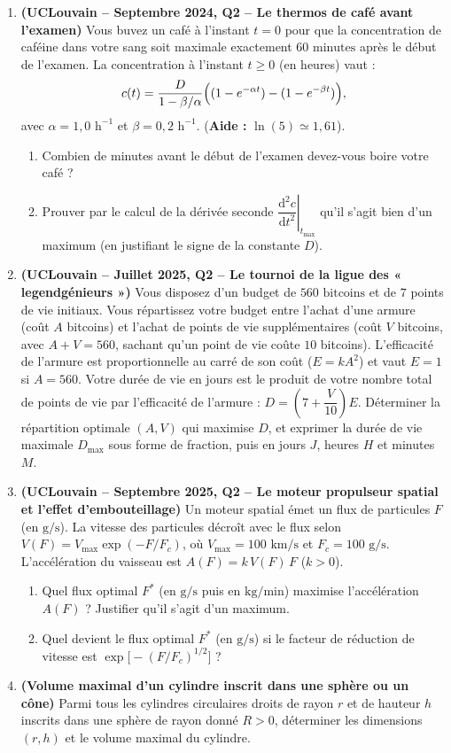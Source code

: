 \begin{enumerate}[label=\textbf{Exercice 5.\arabic* --}]
    \item \textbf{(UCLouvain -- Septembre 2024, Q2 -- Le thermos de café avant l'examen)} Vous buvez un café à l'instant $t = 0$ pour que la concentration de caféine dans votre sang soit maximale exactement $60\text{ minutes}$ après le début de l'examen. La concentration à l'instant $t \ge 0$ (en heures) vaut :
    \[
        c(t) = \frac{D}{1 - \beta/\alpha}\Bigl((1 - e^{-\alpha t}) - (1 - e^{-\beta t})\Bigr),
    \]
    avec $\alpha = 1,0\text{ h}^{-1}$ et $\beta = 0,2\text{ h}^{-1}$. (\textbf{Aide :} $\ln(5) \simeq 1,61$).
    \begin{enumerate}
        \item Combien de minutes avant le début de l'examen devez-vous boire votre café ?
        \item Prouver par le calcul de la dérivée seconde $\left.\dfrac{\mathrm{d}^2 c}{\mathrm{d}t^2}\right|_{t_{\max}}$ qu'il s'agit bien d'un maximum (en justifiant le signe de la constante $D$).
    \end{enumerate}

    \item \textbf{(UCLouvain -- Juillet 2025, Q2 -- Le tournoi de la ligue des « legendgénieurs »)} Vous disposez d'un budget de $560\text{ bitcoins}$ et de $7$ points de vie initiaux. Vous répartissez votre budget entre l'achat d'une armure (coût $A$ bitcoins) et l'achat de points de vie supplémentaires (coût $V$ bitcoins, avec $A + V = 560$, sachant qu'un point de vie coûte $10$ bitcoins). L'efficacité de l'armure est proportionnelle au carré de son coût ($E = kA^2$) et vaut $E = 1$ si $A = 560$. Votre durée de vie en jours est le produit de votre nombre total de points de vie par l'efficacité de l'armure : $D = \left(7 + \dfrac{V}{10}\right)E$.
    Déterminer la répartition optimale $(A, V)$ qui maximise $D$, et exprimer la durée de vie maximale $D_{\max}$ sous forme de fraction, puis en jours $J$, heures $H$ et minutes $M$.

    \item \textbf{(UCLouvain -- Septembre 2025, Q2 -- Le moteur propulseur spatial et l'effet d'embouteillage)} Un moteur spatial émet un flux de particules $F$ (en $\text{g/s}$). La vitesse des particules décroît avec le flux selon $V(F) = V_{\max}\exp(-F/F_c)$, où $V_{\max} = 100\text{ km/s}$ et $F_c = 100\text{ g/s}$. L'accélération du vaisseau est $A(F) = k\,V(F)\,F$ ($k > 0$).
    \begin{enumerate}
        \item Quel flux optimal $F^*$ (en $\text{g/s}$ puis en $\text{kg/min}$) maximise l'accélération $A(F)$ ? Justifier qu'il s'agit d'un maximum.
        \item Quel devient le flux optimal $F^*$ (en $\text{g/s}$) si le facteur de réduction de vitesse est $\exp\bigl[-(F/F_c)^{1/2}\bigr]$ ?
    \end{enumerate}

    \item \textbf{(Volume maximal d'un cylindre inscrit dans une sphère ou un cône)} Parmi tous les cylindres circulaires droits de rayon $r$ et de hauteur $h$ inscrits dans une sphère de rayon donné $R > 0$, déterminer les dimensions $(r, h)$ et le volume maximal du cylindre.
\end{enumerate}
